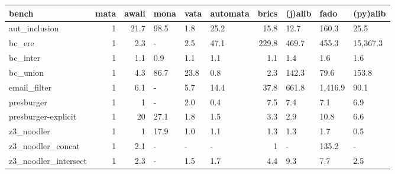 \begin{tabular}{lrrlllrlll}
\hline
 bench                &   mata &   awali & mona   & vata   & automata   &   brics & (j)alib   & fado    & (py)alib   \\
\hline
 aut_inclusion        &      1 &    21.7 & 98.5   & 1.8    & 25.2       &    15.8 & 12.7      & 160.3   & 25.5       \\
 bc_ere               &      1 &     2.3 & -      & 2.5    & 47.1       &   229.8 & 469.7     & 455.3   & 15,367.3   \\
 bc_inter             &      1 &     1.1 & 0.9    & 1.1    & 1.1        &     1.1 & 1.4       & 1.6     & 1.6        \\
 bc_union             &      1 &     4.3 & 86.7   & 23.8   & 0.8        &     2.3 & 142.3     & 79.6    & 153.8      \\
 email_filter         &      1 &     6.1 & -      & 5.7    & 14.4       &    37.8 & 661.8     & 1,416.9 & 90.1       \\
 presburger           &      1 &     1   & -      & 2.0    & 0.4        &     7.5 & 7.4       & 7.1     & 6.9        \\
 presburger-explicit  &      1 &    20   & 27.1   & 1.8    & 1.5        &     3.3 & 2.9       & 10.8    & 6.6        \\
 z3_noodler           &      1 &     1   & 17.9   & 1.0    & 1.1        &     1.3 & 1.3       & 1.7     & 0.5        \\
 z3_noodler_concat    &      1 &     2.1 & -      & -      & -          &     1   & -         & 135.2   & -          \\
 z3_noodler_intersect &      1 &     2.3 & -      & 1.5    & 1.7        &     4.4 & 9.3       & 7.7     & 2.5        \\
\hline
\end{tabular}